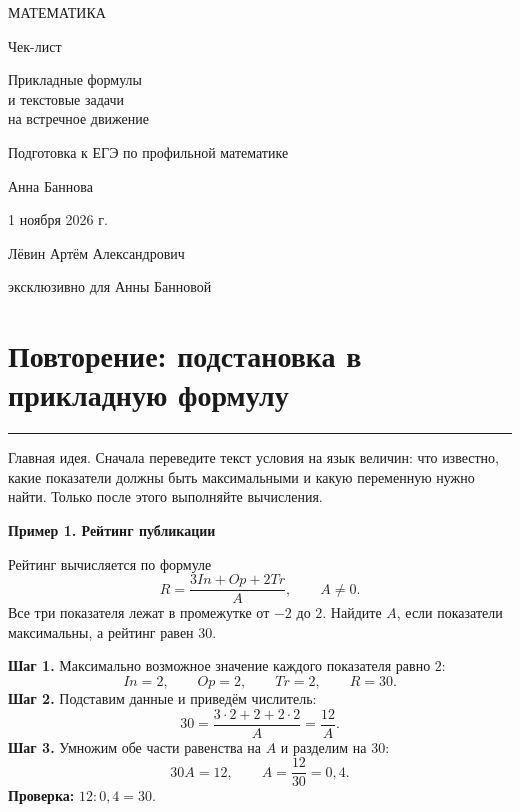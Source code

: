 \documentclass[a4paper,12pt]{article}
\newcommand{\key}[1]{\textcolor{darkaccent}{#1}}
\newcommand{\lessonsection}[1]{\section{\texorpdfstring{#1}{#1}}\vspace{-3pt}\noindent\color{accent}\rule{\linewidth}{0.4pt}\color{textgray}\vspace{2pt}}
\newcommand{\example}[1]{\par\medskip\textcolor{darkaccent}{\textbf{#1}}\par\smallskip}
\begin{document}
\thispagestyle{empty}
\begin{center}
\vspace*{13mm}
{\Large\color{darkaccent}МАТЕМАТИКА\par}
\vspace{17mm}
{\huge Чек-лист\par}
\vspace{12mm}
{\LARGE\color{accent}Прикладные формулы\\[4pt] и текстовые задачи\\[4pt] на встречное движение\par}
\vspace{17mm}
{\large Подготовка к ЕГЭ по профильной математике\par}
\vspace{16mm}
{\Large Анна Баннова\par}
\vspace{12mm}
{\large 1 ноября 2026 г.\par}
\vspace{10mm}
{Лёвин Артём Александрович\par}
{эксклюзивно для Анны Банновой\par}
\vspace{12mm}
\vspace{9mm}
\end{center}
\clearpage

\lessonsection{Повторение: подстановка в прикладную формулу}

\key{Главная идея.} Сначала переведите текст условия на язык величин: что известно, какие показатели должны быть максимальными и какую переменную нужно найти. Только после этого выполняйте вычисления.

\example{Пример 1. Рейтинг публикации}

Рейтинг вычисляется по формуле
\[
R=\frac{3In+Op+2Tr}{A},\qquad A\ne0.
\]
Все три показателя лежат в промежутке от $-2$ до $2$. Найдите $A$, если показатели максимальны, а рейтинг равен $30$.

\textbf{Шаг 1.} Максимально возможное значение каждого показателя равно $2$:
\[
In=2,\qquad Op=2,\qquad Tr=2,\qquad R=30.
\]
\textbf{Шаг 2.} Подставим данные и приведём числитель:
\[
30=\frac{3\cdot2+2+2\cdot2}{A}=\frac{12}{A}.
\]
\textbf{Шаг 3.} Умножим обе части равенства на $A$ и разделим на $30$:
\[
30A=12,\qquad A=\frac{12}{30}=\boxed{0{,}4}.
\]
\textbf{Проверка:} $12:0{,}4=30$.
\end{document}
